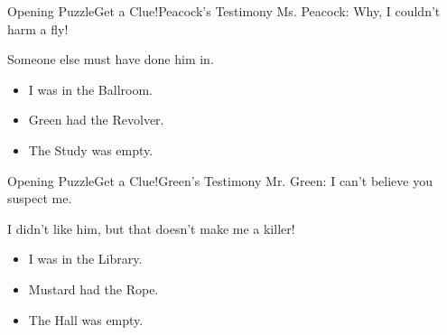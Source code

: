 \begin{customPuzzle}{Opening Puzzle}{Get a Clue!}{Peacock's Testimony}
{\noindent\Large Ms. Peacock: Why, I couldn't harm a fly!}

Someone else must have done him in.

\begin{itemize}
\item I was in the Ballroom.
\item Green had the Revolver.
\item The Study was empty.
\end{itemize}

\end{customPuzzle}
\begin{customPuzzle}{Opening Puzzle}{Get a Clue!}{Green's Testimony}
{\noindent\Large Mr. Green: I can't believe you suspect me.}

I didn't like him, but that doesn't make me a killer!

\begin{itemize}
\item I was in the Library.
\item Mustard had the Rope.
\item The Hall was empty.
\end{itemize}

\end{customPuzzle}
